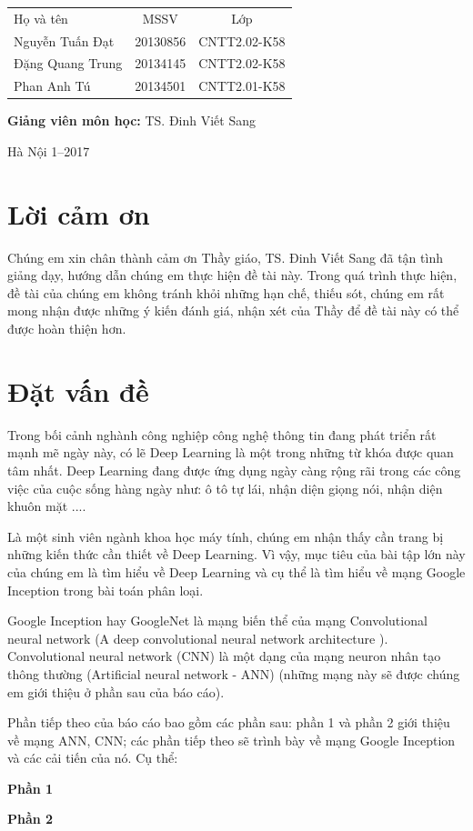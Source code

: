 \documentclass[a4paper,12pt]{report}
\renewcommand{\contentsname}{Mục lục}
\begin{document}
\begin{longtable}{l c c}

Họ và tên & MSSV  & Lớp\\
Nguyễn Tuấn Đạt & 20130856 & CNTT2.02-K58 \\
Đặng Quang Trung & 20134145 & CNTT2.02-K58 \\
Phan Anh Tú & 20134501 & CNTT2.01-K58 \\
\end{longtable}

\hspace{0.6cm}\fontsize{14}{16}\selectfont \textbf{Giảng viên môn học: }TS. Đinh Viết Sang \\[1.5cm]
\begin{center}
\fontsize{16}{19}\selectfont Hà Nội 1--2017

\end{center}
\newpage

\pdfbookmark{\contentsname}{toc}
\tableofcontents
\listoffigures


{}
\chapter*{Lời cảm ơn}
Chúng em xin chân thành cảm ơn Thầy giáo, TS. Đinh Viết Sang đã tận tình giảng dạy, hướng dẫn chúng em thực hiện đề tài này. Trong quá trình thực hiện, đề tài của chúng em không tránh khỏi những hạn chế, thiếu sót, chúng em rất mong nhận được những ý kiến đánh giá, nhận xét của Thầy để đề tài này có thể được hoàn thiện hơn.


\chapter{Đặt vấn đề}
Trong bối cảnh nghành công nghiệp công nghệ thông tin đang phát triển rất mạnh mẽ ngày này, có lẽ Deep Learning là một trong những từ khóa được quan tâm nhất. Deep Learning đang được ứng dụng ngày càng rộng rãi trong các công việc của cuộc sống hàng ngày như: ô tô tự lái, nhận diện giọng nói, nhận diện khuôn mặt ....
\par Là một sinh viên ngành khoa học máy tính, chúng em nhận thấy cần trang bị những kiến thức cần thiết về Deep Learning. Vì vậy, mục tiêu của bài tập lớn này của chúng em là tìm hiểu về Deep Learning và cụ thể là tìm hiểu về mạng Google Inception trong bài toán phân loại.
\par Google Inception hay  GoogleNet là mạng biến thể của mạng Convolutional neural network (A deep convolutional neural network architecture \cite{googlenet}). Convolutional neural network (CNN) là một dạng của mạng neuron nhân tạo thông thường (Artificial neural network - ANN) (những mạng này sẽ được chúng em giới thiệu ở phần sau của báo cáo).  
\par Phần tiếp theo của báo cáo bao gồm các phần sau: phần 1 và phần 2 giới thiệu về mạng ANN, CNN; các phần tiếp theo sẽ trình bày về mạng Google Inception và các cải tiến của nó. Cụ thể:
\par \textbf{Phần 1}
\par \textbf{Phần 2} 
\end{document}
